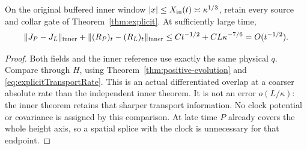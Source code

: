 \begin{corollary}
\label{cor:inner-differentiated-overlap}
On the original buffered inner window
$|x|\le X_{\rm in}(t)\asymp\kappa^{1/3}$, retain every source and
collar gate of Theorem~\ref{thm:explicit}. At sufficiently large time,
\begin{equation}
 \|J_P-J_L\|_{\rm inner}
  +\|(R_P)_t-(R_L)_t\|_{\rm inner}
 \le Ct^{-1/2}+CL\kappa^{-7/6}=O(t^{-1/2}).
 \label{eq:positive-differentiated-overlap}
\end{equation}
\end{corollary}
\begin{proof}
Both fields and the inner reference use exactly the same physical $q$.
Compare through $H$, using Theorem~\ref{thm:positive-evolution} and
\eqref{eq:explicitTransportRate}. This is an actual differentiated
overlap at a coarser absolute rate than the independent inner theorem.
It is not an error $o(L/\kappa)$: the inner theorem retains that sharper
transport information. No clock potential or covariance is assigned
by this comparison. At late time $P$ already covers the whole height
axis, so a spatial splice with the clock is unnecessary for that endpoint.
\end{proof}

